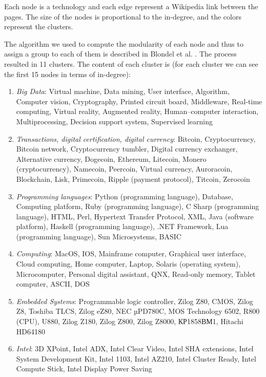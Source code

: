 \documentclass[b5paper,]{book}
\theoremstyle{definition}
\theoremstyle{definition}
\theoremstyle{definition}
\theoremstyle{remark}
\begin{document}
Each node is a technology and each edge represent a Wikipedia link
between the pages. The size of the nodes is proportional to the
in-degree, and the colors represent the clusters.

The algorithm we used to compute the modularity of each node and thus to
assign a group to each of them is described in Blondel et al.
\citep{blondel2008fast}. The process resulted in 11 clusters. The
content of each cluster is (for each cluster we can see the first 15
nodes in terms of in-degree):

\begin{enumerate}
\def\labelenumi{\arabic{enumi}.}
\item
  \emph{Big Data}: Virtual machine, Data mining, User interface,
  Algorithm, Computer vision, Cryptography, Printed circuit board,
  Middleware, Real-time computing, Virtual reality, Augmented reality,
  Human--computer interaction, Multiprocessing, Decision support system,
  Supervised learning
\item
  \emph{Transactions, digital certification, digital currency}: Bitcoin,
  Cryptocurrency, Bitcoin network, Cryptocurrency tumbler, Digital
  currency exchanger, Alternative currency, Dogecoin, Ethereum,
  Litecoin, Monero (cryptocurrency), Namecoin, Peercoin, Virtual
  currency, Auroracoin, Blockchain, Lisk, Primecoin, Ripple (payment
  protocol), Titcoin, Zerocoin
\item
  \emph{Programming languages}: Python (programming language), Database,
  Computing platform, Ruby (programming language), C Sharp (programming
  language), HTML, Perl, Hypertext Transfer Protocol, XML, Java
  (software platform), Haskell (programming language), .NET Framework,
  Lua (programming language), Sun Microsystems, BASIC
\item
  \emph{Computing}: MacOS, IOS, Mainframe computer, Graphical user
  interface, Cloud computing, Home computer, Laptop, Solaris (operating
  system), Microcomputer, Personal digital assistant, QNX, Read-only
  memory, Tablet computer, ASCII, DOS
\item
  \emph{Embedded Systems}: Programmable logic controller, Zilog Z80,
  CMOS, Zilog Z8, Toshiba TLCS, Zilog eZ80, NEC µPD780C, MOS Technology
  6502, R800 (CPU), U880, Zilog Z180, Zilog Z800, Zilog Z8000,
  КР1858ВМ1, Hitachi HD64180
\item
  \emph{Intel}: 3D XPoint, Intel ADX, Intel Clear Video, Intel SHA
  extensions, Intel System Development Kit, Intel 1103, Intel AZ210,
  Intel Cluster Ready, Intel Compute Stick, Intel Display Power Saving

\end{enumerate}
\end{document}
